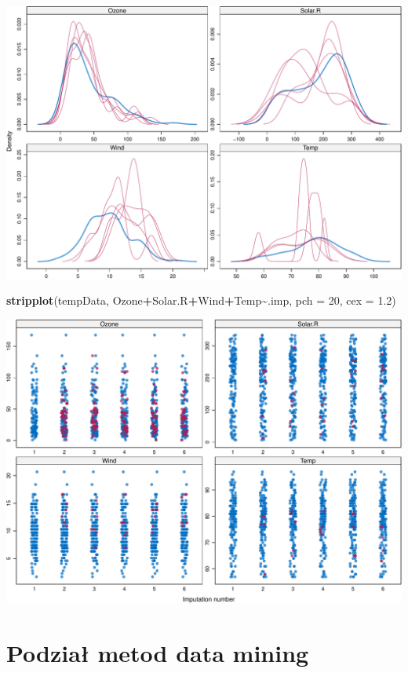 \documentclass[
]{book}
\newenvironment{Shaded}{\begin{snugshade}}{\end{snugshade}}
\newcommand{\AttributeTok}[1]{\textcolor[rgb]{0.13,0.29,0.53}{#1}}
\newcommand{\DecValTok}[1]{\textcolor[rgb]{0.00,0.00,0.81}{#1}}
\newcommand{\FloatTok}[1]{\textcolor[rgb]{0.00,0.00,0.81}{#1}}
\newcommand{\FunctionTok}[1]{\textcolor[rgb]{0.13,0.29,0.53}{\textbf{#1}}}
\newcommand{\NormalTok}[1]{#1}
\newcommand{\SpecialCharTok}[1]{\textcolor[rgb]{0.81,0.36,0.00}{\textbf{#1}}}
\theoremstyle{plain}
\theoremstyle{definition}
\theoremstyle{definition}
\theoremstyle{definition}
\theoremstyle{definition}
\theoremstyle{definition}
\theoremstyle{remark}
\begin{document}
\includegraphics{EksploracjaDanych_files/figure-latex/unnamed-chunk-9-1.pdf}

\begin{Shaded}
\begin{Highlighting}[]
\FunctionTok{stripplot}\NormalTok{(tempData, Ozone}\SpecialCharTok{+}\NormalTok{Solar.R}\SpecialCharTok{+}\NormalTok{Wind}\SpecialCharTok{+}\NormalTok{Temp}\SpecialCharTok{\textasciitilde{}}\NormalTok{.imp, }\AttributeTok{pch =} \DecValTok{20}\NormalTok{, }\AttributeTok{cex =} \FloatTok{1.2}\NormalTok{)}
\end{Highlighting}
\end{Shaded}

\includegraphics{EksploracjaDanych_files/figure-latex/unnamed-chunk-9-2.pdf}

\chapter{Podział metod data mining}\label{podziaux142-metod-data-mining}
\end{document}

